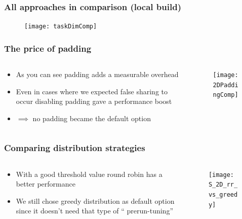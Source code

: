 \begin{frame}
	\frametitle{All approaches in comparison (local build)}
	\begin{figure}
		\centering
		\texttt{[image: taskDimComp]}
		\label{fig:taskdimcomp}
	\end{figure}
	
\end{frame}

\begin{frame}
	\frametitle{The price of padding}
	\vspace{0.8cm}
	\begin{columns}
		\begin{column}{0.4\linewidth}
			\large
			\begin{itemize}
				\setlength\itemsep{1em}
				\item As you can see padding adds a measurable overhead
				\item Even in cases where we expected false sharing to occur disabling padding gave a performance boost
				\item $\implies$ no padding became the default option
			\end{itemize}
			
		\end{column}
		\begin{column}{0.6\linewidth}
			\vspace{-1.6cm}
				\begin{figure}
				\centering
				\texttt{[image: 2DPaddingComp]}
				\label{fig:2dpaddingcomp}
			\end{figure}
		\end{column}
	\end{columns}
\end{frame}

\begin{frame}
	\frametitle{Comparing distribution strategies}
	\begin{columns}
		\begin{column}{0.4\linewidth}
			\large
			\vspace{0.6cm}
			\begin{itemize}
				\setlength\itemsep{1em}
				\item With a good threshold value round robin has a better performance
				\item We still chose greedy distribution as default option since it doesn't need that type of "` prerun-tuning"'
			\end{itemize}
			
		\end{column}
		\begin{column}{0.6\linewidth}
			\begin{figure}
				\centering
				\texttt{[image: S\_2D\_rr\_vs\_greedy]}
				\label{fig:s2drrvsgreedy}
			\end{figure}
			
		\end{column}
	\end{columns}
\end{frame}

